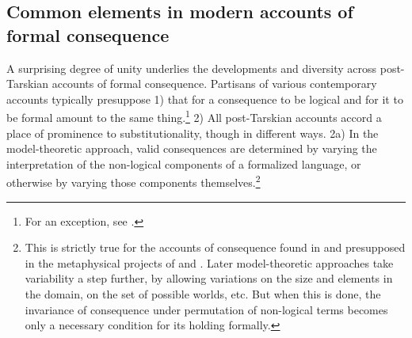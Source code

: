 \documentclass[]{article}
\begin{document}
\subsection{Common elements in modern accounts of formal consequence}
A surprising degree of unity underlies the developments and diversity across post-Tarskian accounts of formal consequence. Partisans of various contemporary accounts typically presuppose 1) that for a consequence to be logical and for it to be formal amount to the same thing.\footnote{For an exception, see \cite{Read1994}.} 2) All post-Tarskian accounts accord a place of prominence to substitutionality, though in different ways. 2a) In the model-theoretic approach, valid consequences are determined by varying the interpretation of the non-logical components of a formalized language, or otherwise by varying those components themselves.\footnote{This is strictly true for the accounts of consequence found in \cite{Tarski2002} and presupposed in the metaphysical projects of \cite{Quine1948} and \cite{Lewis1968}. Later model-theoretic approaches take variability a step further, by allowing variations on the size and elements in the domain, on the set of possible worlds, etc. But when this is done, the invariance of consequence under permutation of non-logical terms becomes only a necessary condition for its holding formally.
	
}
\end{document}

